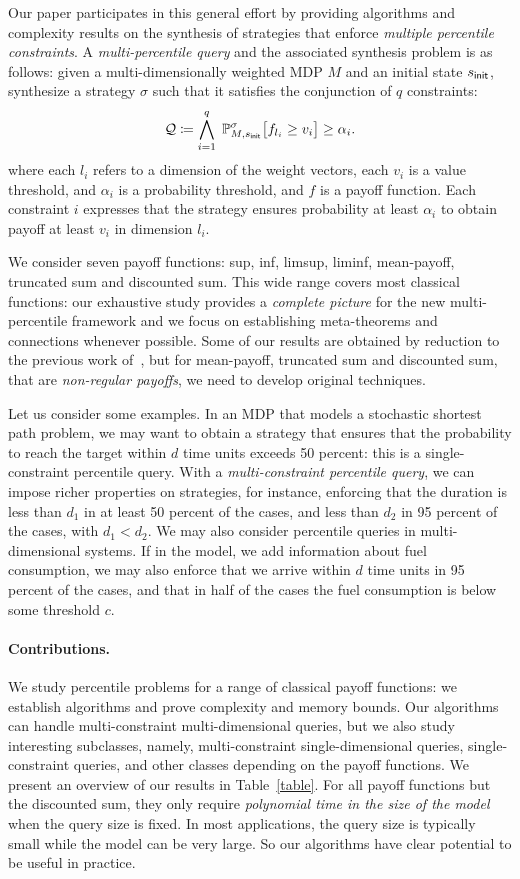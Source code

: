 \documentclass{llncs}
\newcommand{\initState}{\ensuremath{s_{{\sf init}}} }
\newcommand{\strat}{\ensuremath{\sigma} }
\newcommand*{\pr}{\mathbb{P}}
\newcommand{\query}{\ensuremath{\mathcal{Q}} }
\begin{document}
Our paper participates in this general effort by providing algorithms and complexity results on the synthesis of strategies that enforce {\em multiple percentile constraints}.  A \textit{multi-percentile query} and the associated synthesis problem is as follows: given a multi-dimensionally weighted MDP $M$ and an initial state $\initState$, synthesize a strategy $\sigma$ such that it satisfies the conjunction of $q$ constraints:
\[
\query \coloneqq \bigwedge_{i = 1}^{q}\; \pr_{M,\initState}^\strat\big[f_{l_{i}} \geq v_i\big] \geq
	\alpha_i.
\]
where each $l_i$ refers to a dimension of the weight vectors, each $v_i$ is a value threshold, and $\alpha_i$ is a probability threshold, and $f$ is a payoff function. Each constraint $i$ expresses that the strategy ensures probability at least $\alpha_{i}$ to obtain payoff at least $v_{i}$ in dimension $l_{i}$.

We consider seven payoff functions: sup, inf, limsup, liminf, mean-payoff, truncated sum and discounted sum. This wide range covers most classical functions: our exhaustive study provides a \textit{complete picture} for the new multi-percentile framework and we focus on establishing meta-theorems and connections whenever possible. Some of our results are obtained by reduction to the previous work of~\cite{EKVY-lmcs08}, but for mean-payoff, truncated sum and discounted sum, that are {\em non-regular payoffs}, we need to develop original techniques.

Let us consider some examples. In an MDP that models a stochastic shortest path problem, we may want to obtain a strategy that ensures that the probability to reach the target within $d$ time units exceeds 50 percent: this is a single-constraint percentile query. With a {\em multi-constraint percentile query}, we can impose richer properties on strategies,
for instance, enforcing that the duration is less than $d_1$ in at least 50 percent of the cases, and less than $d_2$ in 95 percent of the cases, with $d_1 < d_2$. 
We may also consider percentile queries in multi-dimensional systems. If in the model, we add information about fuel consumption, we may also enforce that we arrive within $d$ time units in 95 percent of the cases, and that in half of the cases the fuel consumption is below some threshold $c$.

\paragraph{\bf Contributions.} We study percentile problems for a range of classical payoff functions: we establish algorithms and prove complexity and memory bounds.
Our algorithms can handle multi-constraint multi-dimensional queries, but
we also study interesting subclasses, namely, multi-constraint single-dimensional queries, single-constraint queries, and other classes depending on the payoff functions.
We present an overview of our results in Table~\ref{table}.
For all payoff functions but the discounted sum, they only require \textit{polynomial time in the size of the model} when the query size is fixed. 
In most applications, the query size is typically small while the model
can be very large. So our algorithms have clear potential to be useful in practice.
\end{document}
